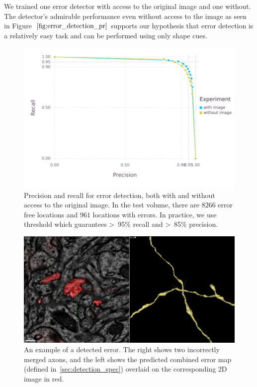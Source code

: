 \documentclass{article}
\begin{document}
We trained one error detector with access to the original image and one without. The detector's admirable performance even without access to the image as seen in Figure~$\ref{fig:error_detection_pr}$ supports our hypothesis that error detection is a relatively easy task and can be performed using only shape cues.
\begin{figure}
\begin{center}
	\includegraphics[width=0.65\linewidth]{pr.pdf}
	\caption{Precision and recall for error detection, both with and without access to the original image. In the test volume, there are $8266$ error free locations and $961$ locations with errors. In practice, we use threshold which guarantees >~95\% recall and >~85\% precision.}
	\label{fig:error_detection_pr}
\end{center}
\end{figure}

\begin{figure}
\begin{center}
	\includegraphics[width=0.65\linewidth]{x_error.jpg}
	\caption{An example of a detected error. The right shows two incorrectly merged axons, and the left shows the predicted combined error map (defined in~\ref{sec:detection_spec}) overlaid on the corresponding 2D image in red.}
	\label{fig:x_error}
\end{center}
\end{figure}
\end{document}

